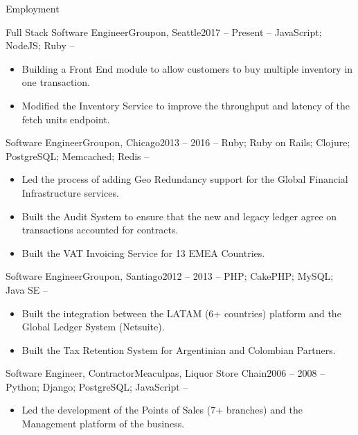 \documentclass[]{mcdowellcv}
\begin{document}
	\makeheader
	\begin{cvsection}{Employment}
		\begin{cvsubsection}{Full Stack Software Engineer}{Groupon, Seattle}{2017 -- Present}
			 -- JavaScript; NodeJS; Ruby --
			\begin{itemize}
			 	\item Building a Front End module to allow customers to buy multiple inventory in one transaction. 
				\item Modified the Inventory Service to improve the throughput and latency of the fetch units endpoint.
			\end{itemize}
		\end{cvsubsection}
		\begin{cvsubsection}{Software Engineer}{Groupon, Chicago}{2013 -- 2016}
			 -- Ruby; Ruby on Rails; Clojure; PostgreSQL; Memcached; Redis --
			\begin{itemize}
				\item Led the process of adding Geo Redundancy support for the Global Financial Infrastructure services.
				\item Built the Audit System to ensure that the new and legacy ledger agree on transactions accounted for contracts.
				\item Built the VAT Invoicing Service for 13 EMEA Countries.
			\end{itemize}
		\end{cvsubsection}
		\begin{cvsubsection}{Software Engineer}{Groupon, Santiago}{2012 -- 2013}
			 -- PHP; CakePHP; MySQL; Java SE --
			\begin{itemize}
				\item Built the integration between the LATAM (6+ countries) platform and the Global Ledger System (Netsuite).
				\item Built the Tax Retention System for Argentinian and Colombian Partners.
			\end{itemize}
		\end{cvsubsection}		
		\begin{cvsubsection}{Software Engineer, Contractor}{Meaculpas, Liquor Store Chain}{2006 -- 2008}
			-- Python; Django; PostgreSQL; JavaScript --
			\begin{itemize}
				\item Led the development of the Points of Sales (7+ branches) and the Management platform of the business.

\end{itemize}
\end{cvsubsection}
\end{cvsection}
\end{document}
